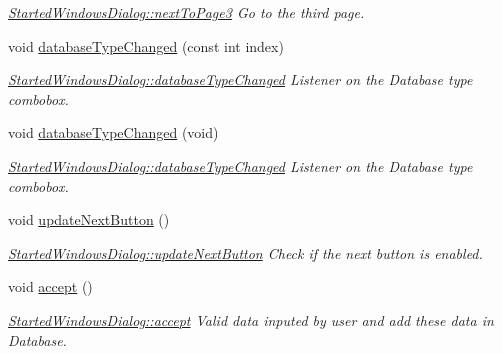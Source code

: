 \begin{DoxyCompactItemize}
\begin{DoxyCompactList}\small\item\em \hyperlink{classGui_1_1Dialogs_1_1StartedWindowsDialog_abac16c4f9fc0a3481565530fa01d8494}{Started\-Windows\-Dialog\-::next\-To\-Page3} Go to the third page. \end{DoxyCompactList}\item 
void \hyperlink{classGui_1_1Dialogs_1_1StartedWindowsDialog_a2e11f7b179785e86a86294d2d2d5357f}{database\-Type\-Changed} (const int index)
\begin{DoxyCompactList}\small\item\em \hyperlink{classGui_1_1Dialogs_1_1StartedWindowsDialog_a2e11f7b179785e86a86294d2d2d5357f}{Started\-Windows\-Dialog\-::database\-Type\-Changed} Listener on the Database type combobox. \end{DoxyCompactList}\item 
\hypertarget{classGui_1_1Dialogs_1_1StartedWindowsDialog_a16430b61886e3139fa275419ec3024b6}{void \hyperlink{classGui_1_1Dialogs_1_1StartedWindowsDialog_a16430b61886e3139fa275419ec3024b6}{database\-Type\-Changed} (void)}\label{classGui_1_1Dialogs_1_1StartedWindowsDialog_a16430b61886e3139fa275419ec3024b6}

\begin{DoxyCompactList}\small\item\em \hyperlink{classGui_1_1Dialogs_1_1StartedWindowsDialog_a2e11f7b179785e86a86294d2d2d5357f}{Started\-Windows\-Dialog\-::database\-Type\-Changed} Listener on the Database type combobox. \end{DoxyCompactList}\item 
\hypertarget{classGui_1_1Dialogs_1_1StartedWindowsDialog_aedfea7b7d80e1877e50647fae5bdc052}{void \hyperlink{classGui_1_1Dialogs_1_1StartedWindowsDialog_aedfea7b7d80e1877e50647fae5bdc052}{update\-Next\-Button} ()}\label{classGui_1_1Dialogs_1_1StartedWindowsDialog_aedfea7b7d80e1877e50647fae5bdc052}

\begin{DoxyCompactList}\small\item\em \hyperlink{classGui_1_1Dialogs_1_1StartedWindowsDialog_aedfea7b7d80e1877e50647fae5bdc052}{Started\-Windows\-Dialog\-::update\-Next\-Button} Check if the next button is enabled. \end{DoxyCompactList}\item 
\hypertarget{classGui_1_1Dialogs_1_1StartedWindowsDialog_aa5da70f656530017906b5aa974fbc080}{void \hyperlink{classGui_1_1Dialogs_1_1StartedWindowsDialog_aa5da70f656530017906b5aa974fbc080}{accept} ()}\label{classGui_1_1Dialogs_1_1StartedWindowsDialog_aa5da70f656530017906b5aa974fbc080}

\begin{DoxyCompactList}\small\item\em \hyperlink{classGui_1_1Dialogs_1_1StartedWindowsDialog_aa5da70f656530017906b5aa974fbc080}{Started\-Windows\-Dialog\-::accept} Valid data inputed by user and add these data in Database. \end{DoxyCompactList}\end{DoxyCompactItemize}
